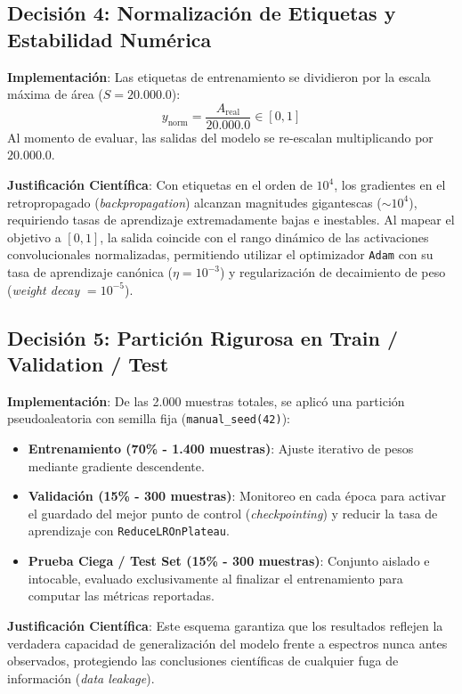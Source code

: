 \documentclass[11pt,a4paper]{article}
\begin{document}
\subsection{Decisión 4: Normalización de Etiquetas y Estabilidad Numérica}
\textbf{Implementación}: Las etiquetas de entrenamiento se dividieron por la escala máxima de área ($S = 20.000.0$):
\begin{equation}
y_{\text{norm}} = \frac{A_{\text{real}}}{20.000.0} \in [0, 1]
\end{equation}
Al momento de evaluar, las salidas del modelo se re-escalan multiplicando por $20.000.0$.

\textbf{Justificación Científica}: Con etiquetas en el orden de $10^4$, los gradientes en el retropropagado (\textit{backpropagation}) alcanzan magnitudes gigantescas ($\sim 10^4$), requiriendo tasas de aprendizaje extremadamente bajas e inestables. Al mapear el objetivo a $[0, 1]$, la salida coincide con el rango dinámico de las activaciones convolucionales normalizadas, permitiendo utilizar el optimizador \texttt{Adam} con su tasa de aprendizaje canónica ($\eta = 10^{-3}$) y regularización de decaimiento de peso (\textit{weight decay} $= 10^{-5}$).

\subsection{Decisión 5: Partición Rigurosa en Train / Validation / Test}
\textbf{Implementación}: De las 2.000 muestras totales, se aplicó una partición pseudoaleatoria con semilla fija (\texttt{manual\_seed(42)}):
\begin{itemize}
    \item \textbf{Entrenamiento (70\% - 1.400 muestras)}: Ajuste iterativo de pesos mediante gradiente descendente.
    \item \textbf{Validación (15\% - 300 muestras)}: Monitoreo en cada época para activar el guardado del mejor punto de control (\textit{checkpointing}) y reducir la tasa de aprendizaje con \texttt{ReduceLROnPlateau}.
    \item \textbf{Prueba Ciega / Test Set (15\% - 300 muestras)}: Conjunto aislado e intocable, evaluado exclusivamente al finalizar el entrenamiento para computar las métricas reportadas.
\end{itemize}

\textbf{Justificación Científica}: Este esquema garantiza que los resultados reflejen la verdadera capacidad de generalización del modelo frente a espectros nunca antes observados, protegiendo las conclusiones científicas de cualquier fuga de información (\textit{data leakage}).
\end{document}
